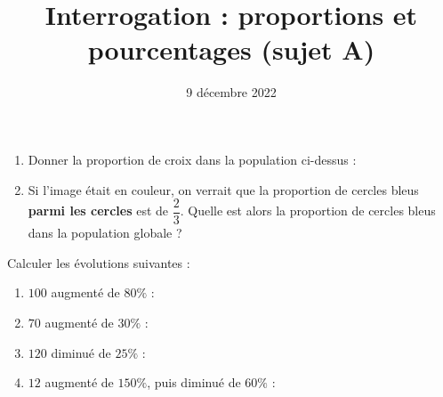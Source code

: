 \documentclass[
	classe=$2^{de}$,
	landscape,
	twocolumn,
	headerTitle={Interrogation 15 min.}
]{évaluation}
\date{9 décembre 2022}
\begin{document}

\title{Interrogation : proportions et pourcentages (sujet A)}
\maketitle

\begin{exercice}
	\begin{center}
	\end{center}

	\begin{enumerate}
		\item Donner la proportion de croix dans la population ci-dessus : 
		\item Si l'image était en couleur, on verrait que la proportion de cercles bleus \textbf{parmi les cercles} est de $\dfrac{2}{3}$. Quelle est alors la proportion de cercles bleus dans la population globale ? 
	\end{enumerate}
\end{exercice}

\begin{exercice}
	Calculer les évolutions suivantes :
	\begin{enumerate}
		\item $100$ augmenté de $80\%$ : 
		\item $70$ augmenté de $30\%$ : 
		\item $120$ diminué de $25\%$ : 
		\item $12$ augmenté de $150\%$, puis diminué de $60\%$ : 
	\end{enumerate}
\end{exercice}
\end{document}
